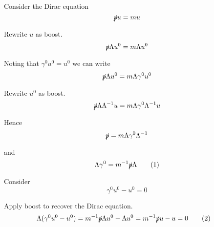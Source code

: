 Consider the Dirac equation
\begin{equation*}
\slashed pu=mu
\end{equation*}

Rewrite $u$ as boost.
\begin{equation*}
\slashed p\Lambda u^0=m\Lambda u^0
\end{equation*}

Noting that $\gamma^0u^0=u^0$ we can write
\begin{equation*}
\slashed p\Lambda u^0=m\Lambda\gamma^0u^0
\end{equation*}

Rewrite $u^0$ as boost.
\begin{equation*}
\slashed p\Lambda\Lambda^{-1}u=m\Lambda\gamma^0\Lambda^{-1}u
\end{equation*}

Hence
\begin{equation*}
\slashed p=m\Lambda\gamma^0\Lambda^{-1}
\end{equation*}

and
\begin{equation*}
\Lambda\gamma^0=m^{-1}\slashed p\Lambda
\tag{1}
\end{equation*}

Consider
\begin{equation*}
\gamma^0u^0-u^0=0
\end{equation*}

Apply boost to recover the Dirac equation.
\begin{align*}
\Lambda(\gamma^0u^0-u^0)&=m^{-1}\slashed p\Lambda u^0-\Lambda u^0=m^{-1}\slashed pu-u=0
\tag{2}
\end{align*}


